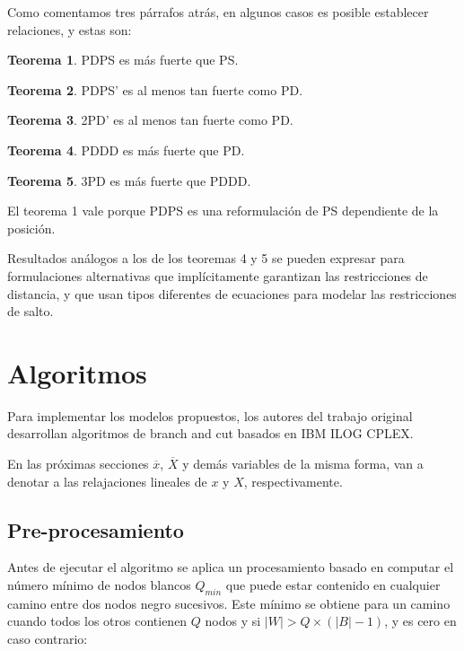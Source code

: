 \documentclass[10pt, a4paper]{article}
\theoremstyle{definition}
\newtheorem{theorem}{Teorema}
\begin{document}
Como comentamos tres párrafos atrás, en algunos casos es posible establecer relaciones, y estas son:

\begin{theorem}
	PDPS es más fuerte que PS.
\end{theorem}

\begin{theorem}
	PDPS' es al menos tan fuerte como PD.
\end{theorem}

\begin{theorem}
	2PD' es al menos tan fuerte como PD.
\end{theorem}

\begin{theorem}
	PDDD es más fuerte que PD.
\end{theorem}

\begin{theorem}
	3PD es más fuerte que PDDD.
\end{theorem}

El teorema 1 vale porque PDPS es una reformulación de PS dependiente de la posición.

Resultados análogos a los de los teoremas 4 y 5 se pueden expresar para formulaciones alternativas que implícitamente garantizan las restricciones de distancia, y que usan tipos diferentes de ecuaciones para modelar las restricciones de salto.

\section{Algoritmos}
  
Para implementar los modelos propuestos, los autores del trabajo original desarrollan algoritmos de branch and cut basados en IBM ILOG CPLEX\cite{cplex}.

En las próximas secciones $\overline{x}$, $\overline{X}$ y demás variables de la misma forma, van a denotar a las relajaciones lineales de $x$ y $X$, respectivamente.
  
\subsection{Pre-procesamiento}

Antes de ejecutar el algoritmo se aplica un procesamiento basado en computar el número mínimo de nodos blancos $Q_{min}$ que puede estar contenido en cualquier camino entre dos nodos negro sucesivos. Este mínimo se obtiene para un camino cuando todos los otros contienen $Q$ nodos y si $|W| > Q \times (|B| - 1)$, y es cero en caso contrario:
\end{document}
